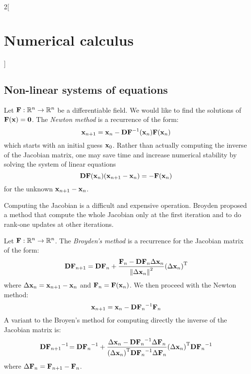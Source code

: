 \documentclass[../../../main_math.tex]{subfiles}
\begin{document}
\begin{multicols}{2}[\section{Numerical calculus}]
  \subsection{Non-linear systems of equations}
  \begin{definition}
    Let $\boldsymbol{\mathrm{F}}:\mathbb{R}^n\rightarrow\mathbb{R}^n$ be a differentiable field. We would like to find the solutions of $\boldsymbol{\mathrm{F}}(\boldsymbol{\mathrm{x}})=\boldsymbol{\mathrm{0}}$.
    The \emph{Newton method} is a recurrence of the form:
    \begin{equation*}
      \boldsymbol{\mathrm{x}}_{n+1}=\boldsymbol{\mathrm{x}}_n-\boldsymbol{\mathrm{DF}}^{-1}(\boldsymbol{\mathrm{x}}_n)\boldsymbol{\mathrm{F}}(\boldsymbol{\mathrm{x}}_n)
    \end{equation*}
    which starts with an initial guess $\boldsymbol{\mathrm{x}}_0$.
    Rather than actually computing the inverse of the Jacobian matrix, one may save time and increase numerical stability by solving the system of linear equations
    $$
      \boldsymbol{\mathrm{DF}}(\boldsymbol{\mathrm{x}}_n)(\boldsymbol{\mathrm{x}}_{n+1}-\boldsymbol{\mathrm{x}}_n)=-\boldsymbol{\mathrm{F}}(\boldsymbol{\mathrm{x}}_n)
    $$
    for the unknown $\boldsymbol{\mathrm{x}}_{n+1}-\boldsymbol{\mathrm{x}}_n$.
  \end{definition}
  \begin{remark}
    Computing the Jacobian is a difficult and expensive operation. Broyden proposed a method that compute the whole Jacobian only at the first iteration and to do rank-one updates at other iterations.
  \end{remark}
  \begin{definition}
    Let $\boldsymbol{\mathrm{F}}:\mathbb{R}^n\rightarrow\mathbb{R}^n$. The \emph{Broyden's method} is a recurrence for the Jacobian matrix of the form:
    $$
      \boldsymbol{\mathrm{DF}}_{n+1}=\boldsymbol{\mathrm{DF}}_n+\frac{\boldsymbol{\mathrm{F}}_n-\boldsymbol{\mathrm{DF}}_n\Delta\boldsymbol{\mathrm{x}}_n}{\left\|\Delta\boldsymbol{\mathrm{x}}_n\right\|^2}{(\Delta\boldsymbol{\mathrm{x}}_n)}^{\mathrm{T}}
    $$
    where $\Delta\boldsymbol{\mathrm{x}}_n=\boldsymbol{\mathrm{x}}_{n+1}-\boldsymbol{\mathrm{x}}_n$ and $\boldsymbol{\mathrm{F}}_n=\boldsymbol{\mathrm{F}}(\boldsymbol{\mathrm{x}}_n)$. We then proceed with the Newton method:
    $$
      \boldsymbol{\mathrm{x}}_{n+1}=\boldsymbol{\mathrm{x}}_n-{\boldsymbol{\mathrm{DF}}_{n}}^{-1}\boldsymbol{\mathrm{F}}_n
    $$
    A variant to the Broyen's method for computing directly the inverse of the Jacobian matrix is:
    $$
      {\boldsymbol{\mathrm{DF}}_{n+1}}^{-1}\!={\boldsymbol{\mathrm{DF}}_n}^{-1}+\frac{\Delta\boldsymbol{\mathrm{x}}_n-{\boldsymbol{\mathrm{DF}}_n}^{-1}\Delta\boldsymbol{\mathrm{F}}_n}{{(\Delta\boldsymbol{\mathrm{x}}_n)}^{\mathrm{T}}{\boldsymbol{\mathrm{DF}}_n}^{-1}\Delta\boldsymbol{\mathrm{F}}_n}{(\Delta\boldsymbol{\mathrm{x}}_n)}^{\mathrm{T}}{\boldsymbol{\mathrm{DF}}_n}^{-1}
    $$
    where $\Delta\boldsymbol{\mathrm{F}}_n=\boldsymbol{\mathrm{F}}_{n+1}-\boldsymbol{\mathrm{F}}_n$.
  \end{definition}

\end{multicols}
\end{document}
